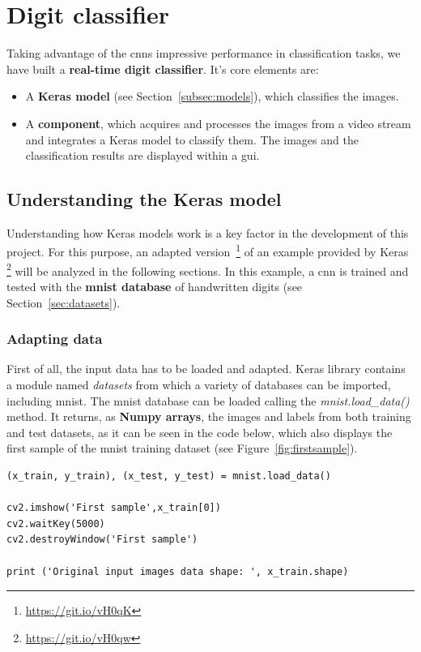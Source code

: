 \chapter{Digit classifier}\label{ch:digitclass}
Taking advantage of the \glspl{cnn} impressive performance in classification tasks, we have built a \textbf{real-time digit classifier}. It's core elements are:
\begin{itemize}
	\item A \textbf{Keras model} (see Section~\ref{subsec:models}), which classifies the images.
	\item A \textbf{component}, which acquires and processes the images from a video stream and integrates a Keras model to classify them. The images and the classification results are displayed within a \gls{gui}.
\end{itemize}

\section{Understanding the Keras model}\label{sec:understanding}
Understanding how Keras models work is a key factor in the development of this project. For this purpose, an adapted version~\footnote{\url{https://git.io/vH0qK}} of an example provided by Keras \footnote{\url{https://git.io/vH0qw}} will be analyzed in the following sections. In this example, a \gls{cnn} is trained and tested with the \textbf{\gls{mnist} database} of handwritten digits (see Section~\ref{sec:datasets}).

\subsection{Adapting data}\label{subsec:adaptdata}
First of all, the input data has to be loaded and adapted. Keras library contains a module named \textit{datasets} from which a variety of databases can be imported, including \gls{mnist}. The \gls{mnist} database can be loaded calling the \textit{mnist.load\_data()} method. It returns, as \textbf{Numpy arrays}, the images and labels from both training and test datasets, as it can be seen in the code below, which also displays the first sample of the \gls{mnist} training dataset (see Figure~\ref{fig:firstsample}).
\begin{lstlisting}
(x_train, y_train), (x_test, y_test) = mnist.load_data()

cv2.imshow('First sample',x_train[0])
cv2.waitKey(5000)
cv2.destroyWindow('First sample')

print ('Original input images data shape: ', x_train.shape) 
\end{lstlisting}

